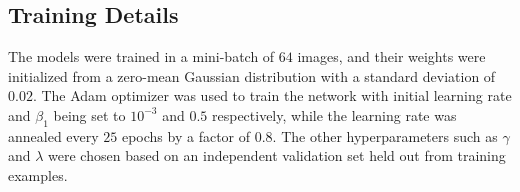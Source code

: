 \subsection{Training Details}
The models were trained in a mini-batch of $64$ images, and their weights were initialized from a zero-mean Gaussian distribution with a standard deviation of $0.02$. The Adam optimizer \cite{kingma2014adam} was used to train the network with initial learning rate and $\beta_1$ being set to $10^{-3}$ and $0.5$ respectively, while the learning rate was annealed every $25$ epochs by a factor of $0.8$. The other hyperparameters such as $\gamma$ and $\lambda$ were chosen based on an independent validation set held out from training examples.

\begin{figure}[t]
\centering
{}%
\end{figure}
